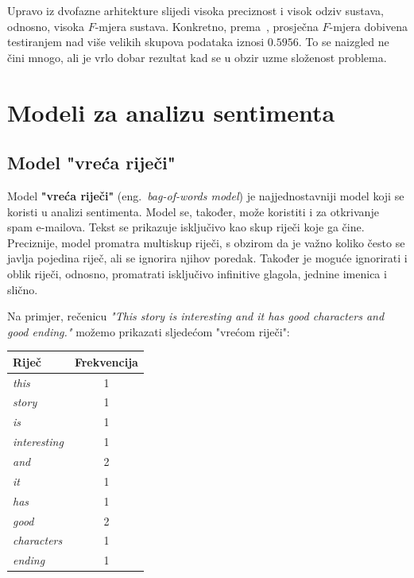 \documentclass[a4paper,twoside,12pt]{memoir} %
\newcommand{\ti}[1]{\textit{#1\/}}
\newcommand{\tb}{\textbf}
\begin{document}
	Upravo iz dvofazne arhitekture slijedi visoka preciznost i visok odziv sustava, odnosno, visoka $F$-mjera sustava. Konkretno, prema~\cite{lee2013deterministic}, prosječna $F$-mjera dobivena testiranjem nad više velikih skupova podataka iznosi $0.5956$. To se naizgled ne čini mnogo, ali je vrlo dobar rezultat kad se u obzir uzme složenost problema.

	\chapter{Modeli za analizu sentimenta}


	\section{Model "vreća riječi"}

	Model \tb{"vreća riječi"} (eng.~\ti{bag-of-words model}) je najjednostavniji model koji se koristi u analizi sentimenta. Model se, također, može koristiti i za otkrivanje spam e-mailova. Tekst se prikazuje isključivo kao skup riječi koje ga čine. Preciznije, model promatra multiskup riječi, s obzirom da je važno koliko često se javlja pojedina riječ, ali se ignorira njihov poredak. Također je moguće ignorirati i oblik riječi, odnosno, promatrati isključivo infinitive glagola, jednine imenica i slično.

	Na primjer, rečenicu \ti{"This story is interesting and it has good characters and good ending."} možemo prikazati sljedećom "vrećom riječi":

	\begin{center}
		\begin{tabular}{lc}
			Riječ                & \multicolumn{1}{l}{Frekvencija} \\ \hline
			\ti{this}        & 1                               \\
			\ti{story}       & 1                               \\
			\ti{is}          & 1                               \\
			\ti{interesting} & 1                               \\
			\ti{and}         & 2                               \\
			\ti{it}          & 1                               \\
			\ti{has}         & 1                               \\
			\ti{good}        & 2                               \\
			\ti{characters}  & 1                               \\
			\ti{ending}      & 1
		\end{tabular}
	\end{center}
\end{document}
